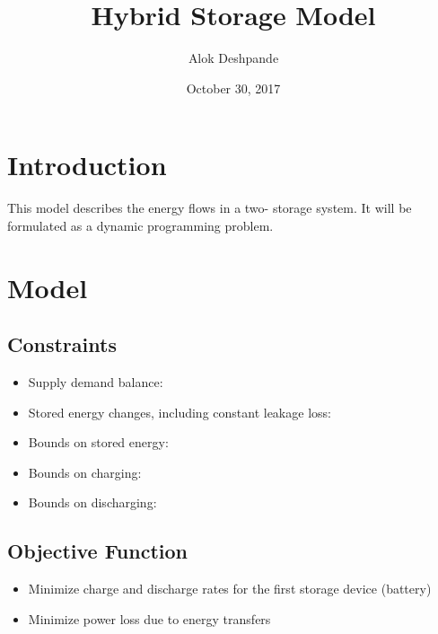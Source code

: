 \documentclass{article}
\title{Hybrid Storage Model}
\author{Alok Deshpande}
\date{October 30, 2017}
\begin{document}
	
	\maketitle
	
	\section{Introduction}
	This model describes the energy flows in a two- storage system. It will be formulated as a dynamic programming problem.
	
	\section{Model}
	
	\subsection{Constraints}
	\begin{itemize}
		\item Supply demand balance: 
		\item Stored energy changes, including constant leakage loss:\\
		\item Bounds on stored energy: 
		\item Bounds on charging:
		\item Bounds on discharging:
	\end{itemize}

	\subsection{Objective Function}
	\begin{itemize}
		\item Minimize charge and discharge rates
		 for the first storage device (battery)
 		\item Minimize power loss due to energy transfers
	\end{itemize}
	
	
	
\end{document}

